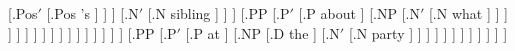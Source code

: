\documentclass{article}
\begin{document}
\begin{landscape}
{                                                                                    [.Pos$'$ [.{Pos\degree\textsubscript{\rbrack}} {'s} ] ] ]
                                                                             [.N$'$ [.{N\degree\textsubscript{\rbrack}} sibling ] ] ]
                                                                        [.PP [.P$'$ [.{P\degree} about ]
                                                                                    [.NP [.N$'$ [.{N\degree\textsubscript{\rbrack}} what ] ] ] ] ] ] ] ] ] ] ] ] ] ] ] ] ]
                                                     [.PP [.P$'$ [.{P\degree} at ]
                                                                 [.NP [.{D\textsubscript{\rbrack}} the ]
                                                                      [.N$'$ [.{N\degree\textsubscript{\rbrack}} party ] ] ] ] ] ] ] ] ] ] ] ]
}


\end{landscape}
\end{document}
